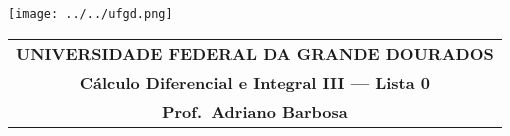 \documentclass[a4paper,5pt]{amsbook}
\begin{document}
\thispagestyle{empty}
\pagestyle{empty}
\begin{minipage}[h]{0.14\textwidth}
	\texttt{[image: ../../ufgd.png]}
\end{minipage}
\begin{minipage}[h]{\textwidth}
\begin{tabular}{c}
{{\bf UNIVERSIDADE FEDERAL DA GRANDE DOURADOS}}\\
{{\bf C\'alculo Diferencial e Integral III --- Lista 0}}\\
{{\bf Prof.\ Adriano Barbosa}}\\
\end{tabular}
\vspace{-0.45cm}
%
\end{minipage}

\end{document}
